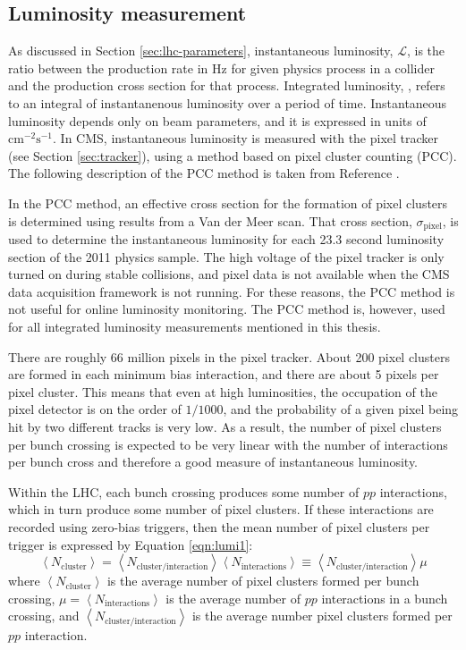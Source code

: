 \subsection{Luminosity measurement}
\label{sec:lumi}

As discussed in Section \ref{sec:lhc-parameters}, instantaneous luminosity, $\mathcal{L}$, is
the ratio between the production rate in Hz for given physics process in a collider and the 
production cross section for that process.  Integrated luminosity, \Lint, 
refers to an integral of instantanenous luminosity over a period of time.
Instantaneous luminosity depends only on beam parameters,
and it is expressed in units of $\text{cm}^{-2}\text{s}^{-1}$.
In CMS, instantaneous luminosity is measured with the pixel tracker (see Section \ref{sec:tracker}),
using a method based on pixel cluster counting (PCC).  
The following description of the PCC method
is taken from Reference \cite{cms-lumi-uncertainty}.

In the PCC method, an effective cross section for the formation
of pixel clusters is determined using results from a Van der Meer
scan.  That cross section, $\sigma_{\text{pixel}}$, is used
to determine the instantaneous luminosity for each 23.3 second
luminosity section of the 2011 physics sample.  The high voltage 
of the pixel tracker is only turned on during stable collisions,
and pixel data is not available when the CMS data acquisition framework is not running.
For these reasons, the PCC method is not useful for online luminosity monitoring.
The PCC method is, however, used for all integrated luminosity measurements
mentioned in this thesis.

There are roughly 66 million pixels in the pixel tracker.
About 200 pixel clusters are formed in each minimum bias interaction,
and there are about 5 pixels per pixel cluster.  This means that
even at high luminosities, the occupation of the pixel detector
is on the order of $1/1000$, and the probability of a given pixel
being hit by two different tracks is very low.
As a result, the number of pixel clusters per 
bunch crossing is expected to be very linear with the number
of interactions per bunch cross and therefore a good measure 
of instantaneous luminosity.

Within the LHC, each bunch crossing produces some number of $pp$ 
interactions, which in turn produce some number of pixel clusters.
If these interactions are recorded using zero-bias triggers, then
the mean number of pixel clusters per trigger is expressed by 
Equation \ref{eqn:lumi1}:
\begin{equation}
  \left<N_{\text{cluster}}\right> = \left<N_{\text{cluster/interaction}}\right> \left<N_{\text{interactions}}\right> \equiv \left<N_{\text{cluster/interaction}}\right> \mu
  \label{eqn:lumi1}
\end{equation}
where $\left<N_{\text{cluster}}\right>$ is the average number of pixel clusters formed per bunch crossing,
$\mu = \left<N_{\text{interactions}}\right>$ is the average number of $pp$ interactions in a bunch crossing, and
$\left<N_{\text{cluster/interaction}}\right>$ is the average number pixel clusters formed per $pp$ interaction.

